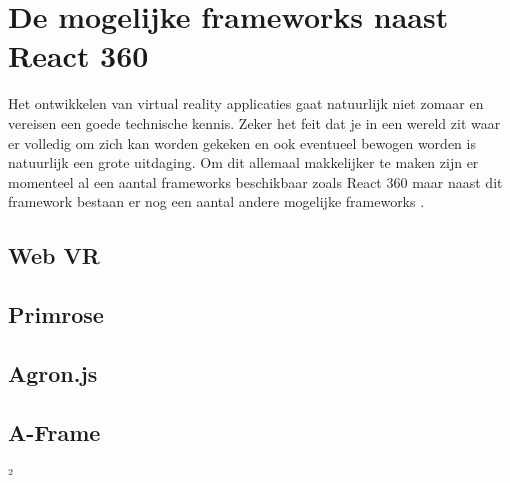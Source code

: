 \section{De mogelijke frameworks naast React 360}
\label{sec:frameworks}
Het ontwikkelen van virtual reality applicaties gaat natuurlijk niet zomaar en vereisen een goede technische kennis. Zeker het feit dat je in een wereld zit waar er volledig om zich kan worden gekeken en ook eventueel bewogen worden is natuurlijk een grote uitdaging. Om dit allemaal makkelijker te maken zijn er momenteel al een aantal frameworks beschikbaar zoals React 360 maar naast dit framework bestaan er nog een aantal andere mogelijke frameworks \autocite{UIUXLab2017}.

\subsection{Web VR}
\label{subsec:Web VR}

\subsection{Primrose}
\label{subsec:Primrose}

\subsection{Agron.js}
\label{subsec:Agron.js}

\subsection{A-Frame}
\label{subsec:A-Frame}²


